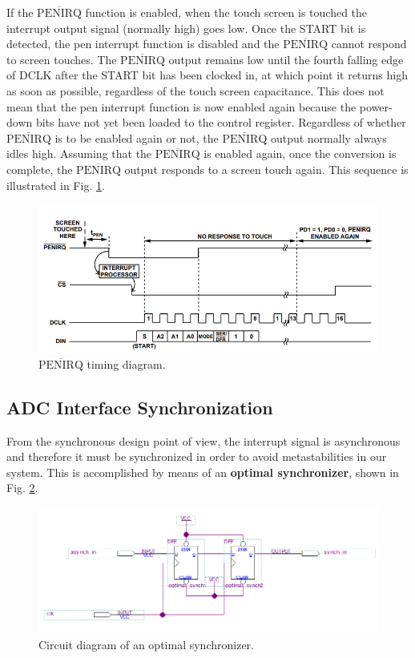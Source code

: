 \documentclass[11pt]{report}
\begin{document}
If the $\overline{\text{PENIRQ}}$ function is enabled, when the touch screen is touched the interrupt output signal (normally high) goes low. Once the START bit is detected, the pen interrupt function is disabled and the $\overline{\text{PENIRQ}}$ cannot respond to screen touches. The $\overline{\text{PENIRQ}}$ output remains low until the fourth falling edge of DCLK after the START bit has been clocked in, at which point it returns high as soon as possible, regardless of the touch screen capacitance. This does not mean that the pen interrupt function is now enabled again because the power-down bits have not yet been loaded to the control register. Regardless of whether $\overline{\text{PENIRQ}}$ is to be enabled again or not, the $\overline{\text{PENIRQ}}$ output normally always idles high. Assuming that the $\overline{\text{PENIRQ}}$ is enabled again, once the conversion is complete, the $\overline{\text{PENIRQ}}$ output responds to a screen touch again. This sequence is illustrated in Fig. \ref{fig:penirq_timing}.

\begin{figure}[!h]
    \centering
    \includegraphics[width=0.8\linewidth]{images/graphic_interface_design/LT24_touchscreen_driver/penirq_timing_diagram.png}
    \caption{$\overline{\text{PENIRQ}}$ timing diagram.}
    \label{fig:penirq_timing}
\end{figure}

\subsection{ADC Interface Synchronization}
From the synchronous design point of view, the interrupt signal is asynchronous and therefore it must be synchronized in order to avoid metastabilities in our system. This is accomplished by means of an \textbf{optimal synchronizer}, shown in Fig. \ref{fig:opt_synch_circuit}.

\begin{figure}[!h]
    \centering
    \includegraphics[width=0.8\linewidth]{images/graphic_interface_design/LT24_touchscreen_driver/optimal_synch_circuit.png}
    \caption{Circuit diagram of an optimal synchronizer.}
    \label{fig:opt_synch_circuit}
\end{figure}
\end{document}
